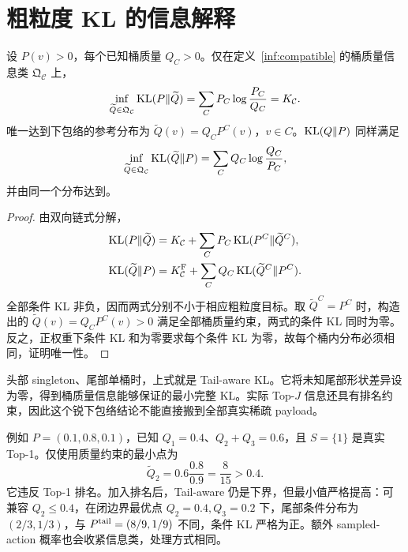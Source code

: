 \section{粗粒度 KL 的信息解释}
\label{inf:identification}

\begin{theorem}
\label{inf:lower-envelope}
设 $P(v)>0$，每个已知桶质量 $Q_C>0$。仅在定义~\ref{inf:compatible} 的桶质量信息类 $\mathfrak Q_{\mathcal C}$ 上，
\begin{equation}
\inf_{\widetilde Q\in\mathfrak Q_{\mathcal C}}\operatorname{KL}(P\Vert\widetilde Q)
=\sum_CP_C\log\frac{P_C}{Q_C}=K_{\mathcal C}.
\end{equation}
唯一达到下包络的参考分布为 $\widetilde Q(v)=Q_CP^C(v)$，$v\in C$。$\operatorname{KL}(Q\Vert P)$ 同样满足
\begin{equation}
\inf_{\widetilde Q\in\mathfrak Q_{\mathcal C}}\operatorname{KL}(\widetilde Q\Vert P)
=\sum_CQ_C\log\frac{Q_C}{P_C},
\end{equation}
并由同一个分布达到。
\end{theorem}
\begin{proof}
由双向链式分解，
\begin{align}
\operatorname{KL}(P\Vert\widetilde Q)&=K_{\mathcal C}+\sum_CP_C\operatorname{KL}(P^C\Vert\widetilde Q^C),\\
\operatorname{KL}(\widetilde Q\Vert P)&=K^{\mathrm F}_{\mathcal C}+\sum_CQ_C\operatorname{KL}(\widetilde Q^C\Vert P^C).
\end{align}
全部条件 KL 非负，因而两式分别不小于相应粗粒度目标。取 $\widetilde Q^C=P^C$ 时，构造出的 $\widetilde Q(v)=Q_CP^C(v)>0$ 满足全部桶质量约束，两式的条件 KL 同时为零。反之，正权重下条件 KL 和为零要求每个条件 KL 为零，故每个桶内分布必须相同，证明唯一性。
\end{proof}

头部 singleton、尾部单桶时，上式就是 Tail-aware KL。它将未知尾部形状差异设为零，得到桶质量信息能够保证的最小完整 KL。实际 Top-$J$ 信息还具有排名约束，因此这个锐下包络结论不能直接搬到全部真实稀疏 payload。

例如 $P=(0.1,0.8,0.1)$，已知 $Q_1=0.4$、$Q_2+Q_3=0.6$，且 $S=\{1\}$ 是真实 Top-1。仅使用质量约束的最小点为
\begin{equation}
\widetilde Q_2=0.6\frac{0.8}{0.9}=\frac8{15}>0.4.
\end{equation}
它违反 Top-1 排名。加入排名后，Tail-aware 仍是下界，但最小值严格提高：可兼容 $Q_2\leq0.4$，在闭边界最优点 $Q_2=0.4,Q_3=0.2$ 下，尾部条件分布为 $(2/3,1/3)$，与 $P^{\mathrm{tail}}=(8/9,1/9)$ 不同，条件 KL 严格为正。额外 sampled-action 概率也会收紧信息类，处理方式相同。

